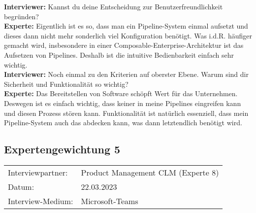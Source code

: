 \begin{linenumbers}
    \textbf{Interviewer:} Kannst du deine Entscheidung zur Benutzerfreundlichkeit begründen?\\
    \textbf{Experte:} Eigentlich ist es so, dass man ein Pipeline-System einmal aufsetzt und dieses dann nicht mehr sonderlich viel Konfiguration benötigt. Was i.d.R. häufiger gemacht wird, insbesondere in einer Composable-Enterprise-Architektur ist das Aufsetzen von Pipelines. Deshalb ist die intuitive Bedienbarkeit einfach sehr wichtig.\\
    \textbf{Interviewer:} Noch einmal zu den Kriterien auf oberster Ebene. Warum sind dir Sicherheit und Funktionalität so wichtig?\\
    \textbf{Experte:} Das Bereitstellen von Software schöpft Wert für das Unternehmen. Deswegen ist es einfach wichtig, dass keiner in meine Pipelines eingreifen kann und diesen Prozess stören kann. Funktionalität ist natürlich essenziell, dass mein Pipeline-System auch das abdecken kann, was dann letztendlich benötigt wird.\\
    
\end{linenumbers}


\newpage
\subsection{Expertengewichtung 5}
        \begin{tabular}{ l l }
    Interviewpartner: & Product Management CLM (Experte 8)\\
    Datum: & 22.03.2023\\
    Interview-Medium: & Microsoft-Teams\\
\end{tabular}
\begin{center}
\begin{figure}[H]
    \centering
    \label{fig:gew_51}
\end{figure}	
\end{center}
\begin{center}
\begin{figure}[H]
    \centering
    \label{fig:gew_52}
\end{figure}	
\end{center}

